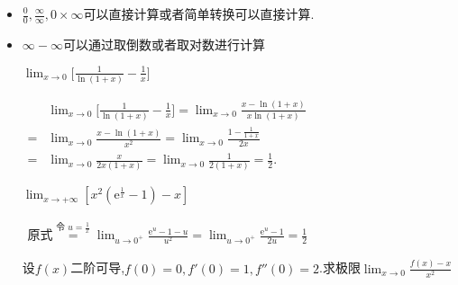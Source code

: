 \documentclass[12pt, a4paper, oneside, UTF8]{ctexbook}  %
\begin{document}
\begin{sloppypar}
    \begin{itemize}
        \item $\frac{0}{0},\frac{\infty}{\infty},0 \times \infty$可以直接计算或者简单转换可以直接计算.
        \item  $\infty -\infty$可以通过取倒数或者取对数进行计算\begin{problem}
              $\operatorname*{lim}_{x\to0}\bigg[{\frac{1}{\ln(1+x)}}-{\frac{1}{x}}\bigg]$
              \end{problem}
              \begin{solution}
                  $
                      \begin{aligned}
                            & \lim_{x \to 0}\bigg[\frac{1}{\ln(1+x)}-\frac{1}{x}\bigg]= \lim_{x\to0}\frac{x-\ln(1+x)}{x\ln(1+x)} \\
                          = & \lim_{x\to0}\frac{x-\ln(1+x)}{x^2}=\lim_{x\to0}\frac{1-\frac{1}{1+x}}{2x}                          \\
                          = & \lim_{x\to0}\frac{x}{2x(1+x)}=\lim_{x\to0}\frac{1}{2(1+x)}=\frac{1}{2}.
                      \end{aligned}
                  $
              \end{solution}
              \begin{problem}
              $\lim_{x\to+\infty}\left[x^2\left(\mathrm{e}^{\frac{1}{x}}-1\right)-x\right]$
              \end{problem}
              \begin{solution}
                  $
                      \begin{aligned}
                          \text{原式}\overset{\text{令 }u=\frac1x}{\operatorname*{=}}\lim_{u\to0^+}\frac{\mathrm{e}^u-1-u}{u^2}=\lim_{u\to0^+}\frac{\mathrm{e}^u-1}{2u}=\frac12
                      \end{aligned}
                  $
              \end{solution}
              \begin{problem}
              设$f(x)$二阶可导,$f(0)=0,f'(0)=1,f''(0)=2$.求极限$\lim_{x \to 0}\frac{f(x)-x}{x^2}$
              \end{problem}
\end{itemize}
\end{sloppypar}
\end{document}
